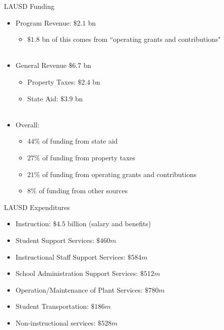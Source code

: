 \documentclass[handout]{beamer}
\begin{document}
\begin{frame}{LAUSD Funding}
\begin{itemize}
\item Program Revenue: $\$2.1$ bn
	\begin{itemize}
	\item $\$1.8$ bn of this comes from ``operating grants and contributions" \\~\\
	\end{itemize}
\item General Revenue $\$6.7$ bn
	\begin{itemize}
	\item Property Taxes: $\$2.4$ bn
	\item State Aid: $\$3.9$ bn \\~\\
	\end{itemize}
\item Overall:
	\begin{itemize}
	\item $44\%$ of funding from state aid
	\item $27\%$ of funding from property taxes
	\item $21\%$ of funding from operating grants and contributions
	\item $8\%$ of funding from other sources
	\end{itemize}
\end{itemize}
\end{frame}

\begin{frame}{LAUSD Expenditures}
\begin{itemize}
\item Instruction: $\$4.5$ billion (salary and benefits)
\item Student Support Services: $\$460m$
\item Instructional Staff Support Services: $\$584m$
\item School Administration Support Services: $\$512m$
\item Operation/Maintenance of Plant Services: $\$780m$
\item Student Transportation: $\$186m$
\item Non-instructional services: $\$528m$
\end{itemize}
\end{frame}
\end{document}
